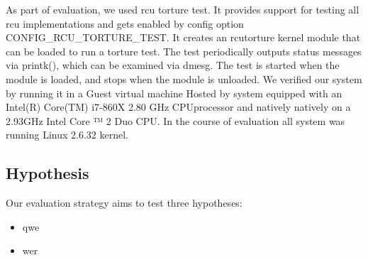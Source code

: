 As part of evaluation, we used rcu torture test. It provides support for testing all rcu implementations and gets enabled by config option CONFIG\_RCU\_TORTURE\_TEST. It creates an rcutorture kernel module that can be loaded to run a torture test.  The test periodically outputs status messages via printk(), which can be examined via dmesg. The test is started when the module is loaded, and stops when the module is unloaded. We veriﬁed our system by running it in a Guest virtual machine Hosted by system equipped with an Intel(R) Core(TM) i7-860X 2.80 GHz CPUprocessor and natively natively on a 2.93GHz Intel Core ™ 2 Duo CPU. In the course of evaluation all system was running Linux 2.6.32 kernel.

\subsection{Hypothesis}
Our evaluation strategy aims to test three hypotheses:
\begin{itemize}
	\item  qwe
	\item  wer
\end{itemize}
